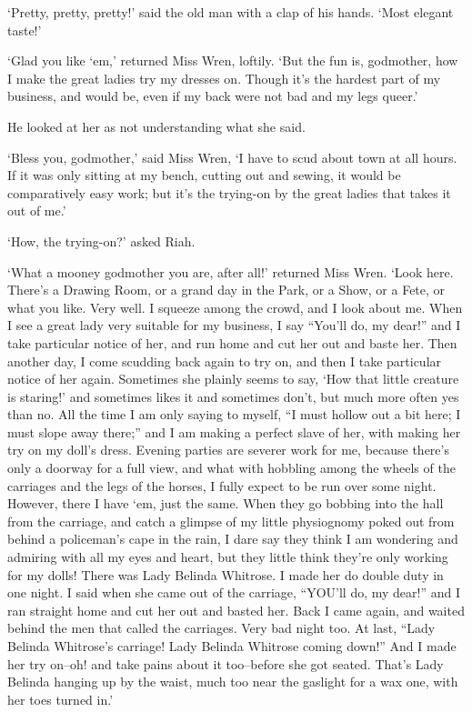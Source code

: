 ‘Pretty, pretty, pretty!’ said the old man with a clap of his hands.
‘Most elegant taste!’

‘Glad you like ‘em,’ returned Miss Wren, loftily. ‘But the fun is,
godmother, how I make the great ladies try my dresses on. Though it’s
the hardest part of my business, and would be, even if my back were not
bad and my legs queer.’

He looked at her as not understanding what she said.

‘Bless you, godmother,’ said Miss Wren, ‘I have to scud about town at
all hours. If it was only sitting at my bench, cutting out and sewing,
it would be comparatively easy work; but it’s the trying-on by the great
ladies that takes it out of me.’

‘How, the trying-on?’ asked Riah.

‘What a mooney godmother you are, after all!’ returned Miss Wren. ‘Look
here. There’s a Drawing Room, or a grand day in the Park, or a Show, or
a Fete, or what you like. Very well. I squeeze among the crowd, and I
look about me. When I see a great lady very suitable for my business, I
say “You’ll do, my dear!” and I take particular notice of her, and run
home and cut her out and baste her. Then another day, I come scudding
back again to try on, and then I take particular notice of her again.
Sometimes she plainly seems to say, ‘How that little creature is
staring!’ and sometimes likes it and sometimes don’t, but much more
often yes than no. All the time I am only saying to myself, “I must
hollow out a bit here; I must slope away there;” and I am making a
perfect slave of her, with making her try on my doll’s dress. Evening
parties are severer work for me, because there’s only a doorway for a
full view, and what with hobbling among the wheels of the carriages
and the legs of the horses, I fully expect to be run over some night.
However, there I have ‘em, just the same. When they go bobbing into the
hall from the carriage, and catch a glimpse of my little physiognomy
poked out from behind a policeman’s cape in the rain, I dare say they
think I am wondering and admiring with all my eyes and heart, but they
little think they’re only working for my dolls! There was Lady Belinda
Whitrose. I made her do double duty in one night. I said when she came
out of the carriage, “YOU’ll do, my dear!” and I ran straight home and
cut her out and basted her. Back I came again, and waited behind the men
that called the carriages. Very bad night too. At last, “Lady Belinda
Whitrose’s carriage! Lady Belinda Whitrose coming down!” And I made her
try on--oh! and take pains about it too--before she got seated. That’s
Lady Belinda hanging up by the waist, much too near the gaslight for a
wax one, with her toes turned in.’

